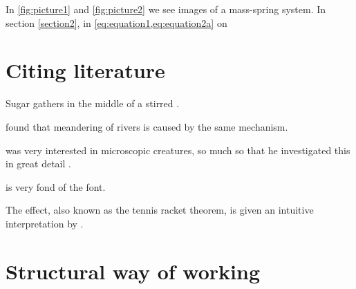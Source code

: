 \documentclass[parskip=half]{scrartcl}
\begin{document}
    In \cref{fig:picture1} and \cref{fig:picture2} we see images of a mass-spring system. In section \cref{section2}, in \cref{eq:equation1,eq:equation2a} on 


\section{Citing literature}
Sugar gathers in the middle of a stirred \cite{Naujoks2017}.

\textcite{Calvert2020} found that meandering of rivers is caused by the same mechanism.

\textcite{David2019} was very interested in microscopic creatures, so much so that he investigated this in great detail \cite{Bender2014}.

\textcite{Brinkley2019} is very fond of the \citeauthor{Leighton1993-hv} font.

The \textcite{Pearson1905-du} effect, also known as the tennis racket theorem, is given an intuitive interpretation by \textcite{Na2015}.


\section{Structural way of working}

\printbibliography[heading=bibintoc]
\end{document}
